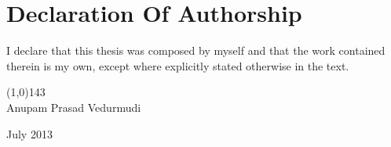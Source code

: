 \chapter*{Declaration Of Authorship}

\noindent I declare that this thesis was composed by myself and that the work contained therein is  my own, except where explicitly stated otherwise in the text.


\vspace{\baselineskip}
\vspace{\baselineskip}
\vspace{\baselineskip}
\vspace{\baselineskip}

\noindent\line(1,0){143}\\
\noindent Anupam Prasad Vedurmudi

\vspace{\baselineskip}
\noindent July 2013